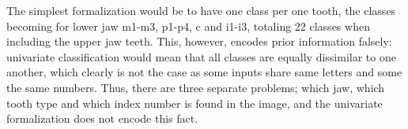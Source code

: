 \documentclass{article}
\begin{document}
The simplest formalization would be to have one class per one tooth, the classes becoming for lower jaw m1-m3, p1-p4, c and i1-i3,
totaling 22 classes when including the upper jaw teeth. This, however, encodes prior information falsely: univariate classification would 
mean that all classes are equally dissimilar to one another, which clearly is not the case as some inputs share same letters and 
some the same numbers. Thus, there are three separate problems; which jaw, which tooth type and which index number is found in the image, 
and the univariate formalization does not encode this fact.


\end{document}
